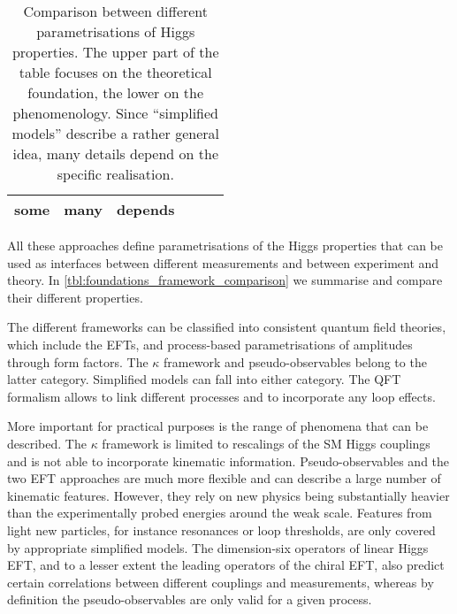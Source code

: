 \begin{table}
\begin{tabularx}{\textwidth}{LLLLLL}
    some & 
    many &
    depends \\
    \bottomrule
  \end{tabularx}
  \caption[Comparison between different parametrisations of Higgs properties]{Comparison
    between different parametrisations of Higgs properties. The upper part of the table
    focuses on the theoretical foundation, the lower on the phenomenology.
    Since ``simplified models'' describe a rather general idea, many
    details depend on the specific realisation.}
  \label{tbl:foundations_framework_comparison}
\end{table}

All these approaches define parametrisations of the Higgs properties
that can be used as interfaces between different measurements and
between experiment and theory. In
\autoref{tbl:foundations_framework_comparison} we summarise and
compare their different properties.

The different frameworks can be classified into consistent quantum
field theories, which include the EFTs, and process-based
parametrisations of amplitudes through form factors. The $\kappa$
framework and pseudo-observables belong to the latter
category. Simplified models can fall into either category. The QFT
formalism allows to link different processes and to incorporate any
loop effects.

More important for practical purposes is the range of phenomena that
can be described. The $\kappa$ framework is limited to rescalings of
the SM Higgs couplings and is not able to incorporate kinematic
information. Pseudo-observables and the two EFT approaches are much
more flexible and can describe a large number of kinematic
features. However, they rely on new physics being substantially
heavier than the experimentally probed energies around the weak
scale. Features from light new particles, for instance resonances or
loop thresholds, are only covered by appropriate simplified
models. The dimension-six operators of linear Higgs EFT, and to a
lesser extent the leading operators of the chiral EFT, also predict
certain correlations between different couplings and measurements,
whereas by definition the pseudo-observables are only valid for a given
process.

